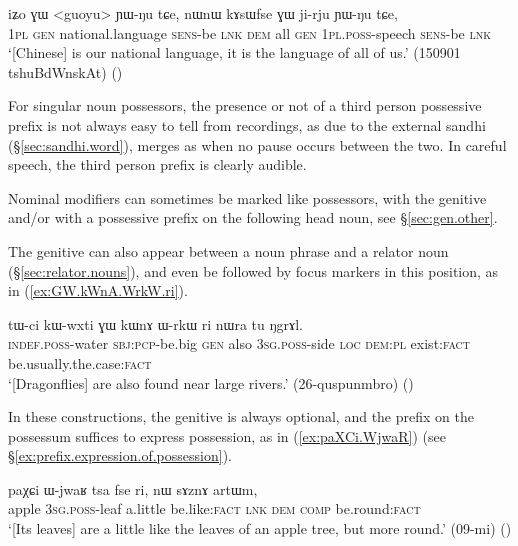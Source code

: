 \begin{exe}
\ex \label{ex:iZo.GW.guoyu}
\gll iʑo ɣɯ <guoyu> ɲɯ-ŋu tɕe, nɯnɯ kɤsɯfse ɣɯ ji-rju ɲɯ-ŋu tɕe, \\
\textsc{1pl} \textsc{gen} national.language \textsc{sens}-be \textsc{lnk} \textsc{dem} all \textsc{gen} \textsc{1pl}.\textsc{poss}-speech \textsc{sens}-be \textsc{lnk} \\
\glt `[Chinese] is our national language, it is the language of all of us.' (150901 tshuBdWnskAt) ()
\end{exe}

For singular noun possessors, the presence or not of a third person possessive prefix  is not always easy to tell from recordings, as due to the external sandhi (§\ref{sec:sandhi.word}),  merges as  when no pause occurs between the two. In careful speech, the third person prefix is clearly audible.

Nominal modifiers can sometimes be marked like possessors, with the genitive and/or with a possessive prefix on the following head noun, see §\ref{sec:gen.other}. 

The genitive can also appear between a noun phrase and a relator noun (§\ref{sec:relator.nouns}), and even be followed by focus markers in this position, as in (\ref{ex:GW.kWnA.WrkW.ri}).

\begin{exe}
\ex \label{ex:GW.kWnA.WrkW.ri}
\gll   tɯ-ci kɯ-wxti ɣɯ kɯnɤ ɯ-rkɯ ri nɯra tu ŋgrɤl.  \\
\textsc{indef}.\textsc{poss}-water \textsc{sbj}:\textsc{pcp}-be.big \textsc{gen} also \textsc{3sg}.\textsc{poss}-side \textsc{loc} \textsc{dem}:\textsc{pl} exist:\textsc{fact} be.usually.the.case:\textsc{fact} \\
\glt `[Dragonflies] are also found near large rivers.' (26-quspunmbro)
()
\end{exe}

In these constructions, the genitive is always optional, and the prefix on the possessum suffices to express possession, as in (\ref{ex:paXCi.WjwaR}) (see §\ref{ex:prefix.expression.of.possession}).

\begin{exe}
\ex \label{ex:paXCi.WjwaR}
\gll paχɕi ɯ-jwaʁ tsa fse ri, nɯ sɤznɤ artɯm,\\
apple \textsc{3sg}.\textsc{poss}-leaf a.little be.like:\textsc{fact} \textsc{lnk} \textsc{dem} \textsc{comp} be.round:\textsc{fact} \\
\glt `[Its leaves] are a little like the leaves of an apple tree, but more round.' (09-mi)
()
\end{exe}

